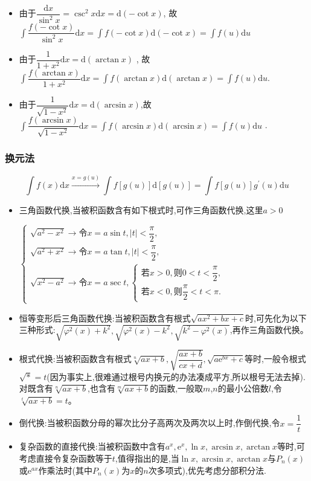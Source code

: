 \documentclass[8pt a4paper, oneside, UTF8]{ctexbook}
\begin{document}
\begin{sloppypar}
\begin{itemize}
        \item 由于$\dfrac{\mathrm{d}x}{\sin^{2}x}=\csc^{2}x \mathrm{d}x=\mathrm{d}(-\cot x)$, 故$\int\dfrac{f(-\cot x)}{\sin^{2}x}\mathrm{d}x=\int f(-\cot x)\mathrm{d}(-\cot x)=\int f(u)\mathrm{d}u$
        \item 由于$\dfrac{1}{1+x^{2}}\mathrm{d}x=\mathrm{d}(\arctan x)$ , 故$\int\dfrac{f(\arctan x)}{1+x^{2}}\mathrm{d}x=\int f(\arctan x)\mathrm{d}(\arctan x)=\int f(u)\mathrm{d}u$.
        \item 由于$\dfrac{1}{\sqrt{1-x^{2}}} \mathrm{d}x=\mathrm{d}(\arcsin x)$,故$\int\dfrac{f(\arcsin x)}{\sqrt{1-x^{2}}}\mathrm{d}x=\int f(\arcsin x)\mathrm{d}(\arcsin x)=\int f(u)\mathrm{d}u$ .
    \end{itemize}
    \subsubsection{换元法}
    $$
        \int f(x)\mathrm{d}x\xrightarrow{x=g(u)}\int f[g(u)]\mathrm{d}[g(u)]=\int f[g(u)]g^{\prime}(u)\mathrm{d}u
    $$
    \begin{itemize}
        \item 三角函数代换,当被积函数含有如下根式时,可作三角函数代换,这里$a > 0$
              \begin{center}
                  $\begin{cases} \sqrt{a^{2}-x^{2}}\to\text{令}x=a\sin t , |t|<\dfrac{\pi}{2} ,\\\sqrt{a^{2}+x^{2}}\to\text{令}x=a\tan t , |t|<\dfrac{\pi}{2} ,\\\sqrt{x^{2}-a^{2}}\to\text{令}x=a\sec t , \begin{cases}\text{若}x>0 ,\text{则}0<t<\dfrac{\pi}{2} ,\\ \text{若}x<0 ,\text{则}\dfrac{\pi}{2}<t<\pi.\end{cases} \end{cases}$
              \end{center}
        \item 恒等变形后三角函数代换:当被积函数含有根式$\sqrt{ax^2+bx+c}$时,可先化为以下三种形式:\newline$\sqrt{\varphi^2(x)+k^2},\sqrt{\varphi^2(x)-k^2},\sqrt{k^2-\varphi^2(x)}$,再作三角函数代换。
        \item 根式代换:当被积函数含有根式$\sqrt[n]{ax+b},\sqrt{\dfrac{ax+b}{cx+d}},\sqrt{a\mathrm{e}^{bx}+c}$等时,一般令根式$\sqrt*=t$(因为事实上,很难通过根号内换元的办法凑成平方,所以根号无法去掉).对既含有$\sqrt[n]{ax+b}$,也含有$\sqrt[m]{ax+b}$的函数,一般取$m$,$n$的最小公倍数$l$,令$\sqrt[t]{ax+b}=t$。
        \item 倒代换:当被积函数分母的幂次比分子高两次及两次以上时,作倒代换,令$x=\dfrac{1}{t}$
        \item 复杂函数的直接代换:当被积函数中含有$a^x,\mathrm{e}^x,\ln x,\arcsin x,\arctan x$等时,可考虑直接令复杂函数等于$t$,值得指出的是,当$\ln x,\arcsin x,\arctan x$与$P_n(x)$或$\mathrm{e}^{ax}$作乘法时(其中$P_n(x)$为$x$的$n$次多项式),优先考虑分部积分法.
    \end{itemize}

\end{sloppypar}
\end{document}
